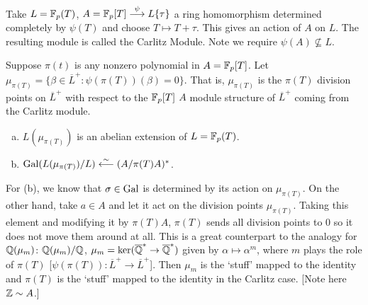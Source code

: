 \begin{dfn}
Take $L=\mathbb{F}_p(T)$, $A=\mathbb{F}_p[T] \stackrel{\psi}{\longrightarrow} L\{\tau\}$ a ring homomorphism determined completely by $\psi(T)$ and choose $T \mapsto T+\tau$. This gives an action of $A$ on $L$. The resulting module is called the Carlitz Module. Note we require $\psi(A) \not\subseteq L$.
\end{dfn}


\begin{dfn}
Suppose $\pi(t)$ is any nonzero polynomial in $A=\mathbb{F}_p[T]$. Let $\mu_{\pi(T)}=\{ \beta \in \overline{L}^+ \colon \psi(\pi(T))(\beta)=0\}$. That is, $\mu_{\pi(T)}$ is the $\pi(T)$ division points on $\overline{L}^+$ with respect to the $\mathbb{F}_p[T]$ $A$ module structure of $\overline{L}^+$ coming from the Carlitz module. 
\end{dfn}

\begin{thm}[Carlitz] \hfill
\begin{enumerate}[(a)]
\item $L(\mu_{\pi(T)})$ is an abelian extension of $L=\mathbb{F}_p(T)$.
\item $\operatorname{Gal}(L(\mu_{\pi(T)})/L) \stackrel{\sim}{\longleftarrow} (A/\pi(T)A)^*$.
\end{enumerate}
\end{thm}

For (b), we know that $\sigma \in \operatorname{Gal}$ is determined by its action on $\mu_{\pi(T)}$. On the other hand, take $a \in A$ and let it act on the division points $\mu_{\pi(T)}$. Taking this element and modifying it by $\pi(T)A$, $\pi(T)$ sends all division points to 0 so it does not move them around at all. This is a great counterpart to the analogy for $\mathbb{Q}(\mu_m)$: $\mathbb{Q}(\mu_m)/\mathbb{Q}$, $\mu_m=\ker( \overline{\mathbb{Q}}^* \to \overline{\mathbb{Q}}^*)$ given by $\alpha \mapsto \alpha^m$, where $m$ plays the role of $\pi(T)$ [$\psi(\pi(T)): \overline{L}^+ \to \overline{L}^+$]. Then $\mu_m$ is the `stuff' mapped to the identity and $\pi(T)$ is the `stuff' mapped to the identity in the Carlitz case. [Note here $\mathbb{Z} \sim A$.] 


